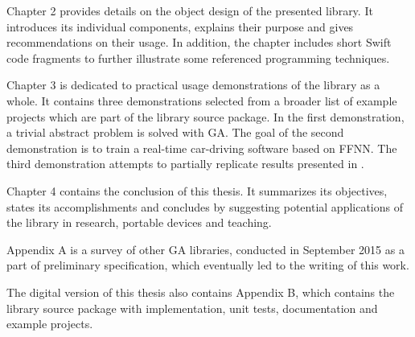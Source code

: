 Chapter 2 provides details on the object design of the presented library. It introduces its individual components, explains their purpose and gives recommendations on their usage. In addition, the chapter includes short Swift code fragments to further illustrate some referenced programming techniques.

Chapter 3 is dedicated to practical usage demonstrations of the library as a whole. It contains three demonstrations selected from a broader list of example projects which are part of the library source package. In the first demonstration, a trivial abstract problem is solved with GA. The goal of the second demonstration is to train a real-time car-driving software based on FFNN. The third demonstration attempts to partially replicate results presented in \cite{EvolvingQwopGaits}.

Chapter 4 contains the conclusion of this thesis. It summarizes its objectives, states its accomplishments and concludes by suggesting potential applications of the library in research, portable devices and teaching.

Appendix A is a survey of other GA libraries, conducted in September 2015 as a part of preliminary specification, which eventually led to the writing of this work.

The digital version of this thesis also contains Appendix B, which contains the library source package with implementation, unit tests, documentation and example projects.
